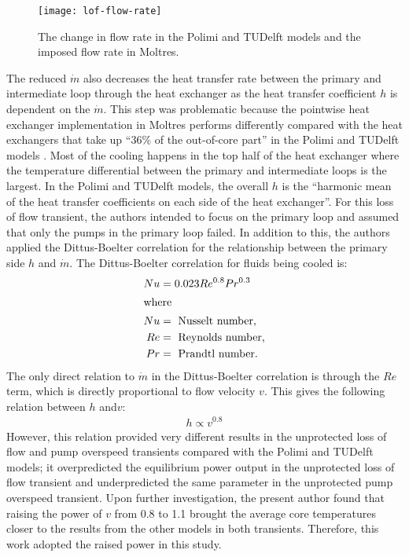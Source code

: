 \begin{figure}[htbp!]
    \centering
    \texttt{[image: lof-flow-rate]}
    \caption{The change in flow rate in the Polimi and TUDelft models and the
    imposed flow rate in Moltres.}
    \label{fig:flowrate}
\end{figure}

The reduced $\dot{m}$ also decreases the heat transfer rate between the
primary and intermediate loop through the heat exchanger as the heat transfer
coefficient $h$ is dependent on the $\dot{m}$. This step was problematic
because
the pointwise heat exchanger implementation in Moltres performs differently
compared with the heat exchangers that take up ``36\% of the out-of-core
part'' in the Polimi and TUDelft models \cite{fiorina_modelling_2014}. Most of
the cooling happens in the top half of the heat exchanger where the
temperature differential between the primary and intermediate loops is the
largest. In the Polimi and TUDelft models, the overall $h$ is the
``harmonic mean of the heat transfer coefficients on each side of the heat
exchanger''. For this loss of flow transient, the authors intended to focus on
the primary loop and assumed that only the pumps in the primary loop failed.
In addition to this, the authors applied the Dittus-Boelter correlation
\cite{dittus_heat_1930} for the relationship between the primary side $h$ and
$\dot{m}$. The Dittus-Boelter correlation for fluids being cooled is:
%
\begin{align}
    Nu &= 0.023 Re^{0.8} Pr^{0.3} \label{eq:db} \\
    \intertext{where}
    Nu &= \text{ Nusselt number,} \nonumber \\
    Re &= \text{ Reynolds number,} \nonumber \\
    Pr &= \text{ Prandtl number.} \nonumber
\end{align}
%
The only direct relation to $\dot{m}$ in the Dittus-Boelter correlation is
through the $Re$ term, which is directly proportional to flow velocity $v$.
This gives the following relation between $h$ and$v$:
%
\begin{align}
    h \propto v^{0.8} \label{eq:hv}
\end{align}
%
However, this relation provided very different results in the unprotected loss
of flow and pump overspeed transients compared with the Polimi and TUDelft
models; it overpredicted the equilibrium power output in the
unprotected loss of flow transient and underpredicted the same parameter in
the unprotected pump overspeed transient. Upon further investigation, the
present author found that raising the power of $v$ from 0.8 to 1.1 brought the
average core temperatures closer to the results from the other models in both
transients. Therefore, this work adopted the raised power in this study.

